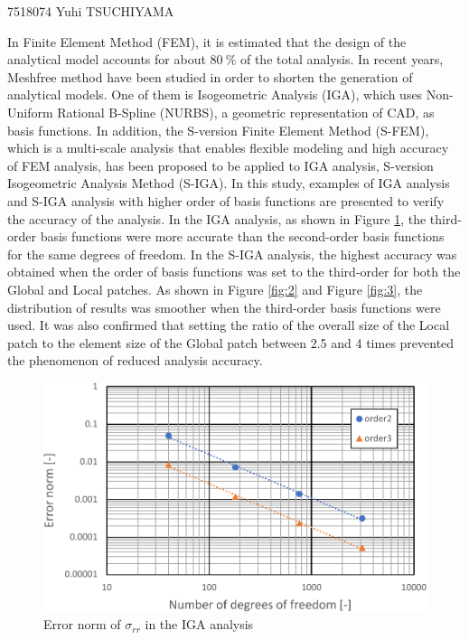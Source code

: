 \documentclass[12pt,a4j,fleqn]{jsarticle}
\begin{document}
\begin{center}
\textsf{}
\end{center}
\vspace{\baselineskip}
\begin{flushleft}
\end{flushleft}
\vspace{-2\baselineskip}
\begin{flushright}
7518074 Yuhi TSUCHIYAMA
\end{flushright}
In Finite Element Method (FEM), it is estimated that
the design of the analytical model accounts for about $80\ \%$ of the total analysis.
%
In recent years, Meshfree method have been studied in order to shorten the generation of analytical models.
%
One of them is Isogeometric Analysis (IGA),
which uses Non-Uniform Rational B-Spline (NURBS),
a geometric representation of CAD,
as basis functions.
%
In addition, the S-version Finite Element Method (S-FEM),
which is a multi-scale analysis that enables flexible modeling and high accuracy of FEM analysis,
has been proposed to be applied to IGA analysis, S-version Isogeometric Analysis Method (S-IGA).
%
In this study, examples of IGA analysis and S-IGA analysis
with higher order of basis functions are presented to verify the accuracy of the analysis.
%
In the IGA analysis, as shown in Figure \ref{fig:1},
the third-order basis functions were more accurate than the second-order basis functions for the same degrees of freedom.
%
In the S-IGA analysis, the highest accuracy was obtained when the order of basis functions was set to the third-order for both the Global and Local patches.
%
As shown in Figure \ref{fig:2} and Figure \ref{fig:3}, the distribution of results was smoother when the third-order basis functions were used.
%
It was also confirmed that setting the ratio of the overall size of the Local patch to the element size of the Global patch
between 2.5 and 4 times prevented the phenomenon of reduced analysis accuracy.

\begin{figure}[htbp]
  \centering
  \includegraphics[keepaspectratio, scale = 0.7]
  {fig/ER01-crop.pdf}
  \caption{Error norm of $\sigma_{rr}$ in the IGA analysis}
  \label{fig:1}
\end{figure}
\end{document}
